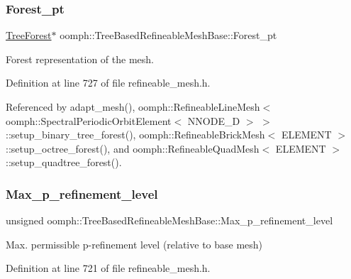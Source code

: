 \subsubsection{\texorpdfstring{Forest\+\_\+pt}{Forest\_pt}}
{\footnotesize\ttfamily \hyperlink{classoomph_1_1TreeForest}{Tree\+Forest}$\ast$ oomph\+::\+Tree\+Based\+Refineable\+Mesh\+Base\+::\+Forest\+\_\+pt\hspace{0.3cm}{\ttfamily [protected]}}



Forest representation of the mesh. 



Definition at line 727 of file refineable\+\_\+mesh.\+h.



Referenced by adapt\+\_\+mesh(), oomph\+::\+Refineable\+Line\+Mesh$<$ oomph\+::\+Spectral\+Periodic\+Orbit\+Element$<$ N\+N\+O\+D\+E\+\_\+D $>$ $>$\+::setup\+\_\+binary\+\_\+tree\+\_\+forest(), oomph\+::\+Refineable\+Brick\+Mesh$<$ E\+L\+E\+M\+E\+N\+T $>$\+::setup\+\_\+octree\+\_\+forest(), and oomph\+::\+Refineable\+Quad\+Mesh$<$ E\+L\+E\+M\+E\+N\+T $>$\+::setup\+\_\+quadtree\+\_\+forest().

\mbox{\label{classoomph_1_1TreeBasedRefineableMeshBase_a39ab498ac06506e1500f9f03e8cecf72}} 
\subsubsection{\texorpdfstring{Max\+\_\+p\+\_\+refinement\+\_\+level}{Max\_p\_refinement\_level}}
{\footnotesize\ttfamily unsigned oomph\+::\+Tree\+Based\+Refineable\+Mesh\+Base\+::\+Max\+\_\+p\+\_\+refinement\+\_\+level\hspace{0.3cm}{\ttfamily [protected]}}



Max. permissible p-\/refinement level (relative to base mesh) 



Definition at line 721 of file refineable\+\_\+mesh.\+h.

\mbox{\label{classoomph_1_1TreeBasedRefineableMeshBase_acd1c5544779f42de66b25a0225644f7d}} 
